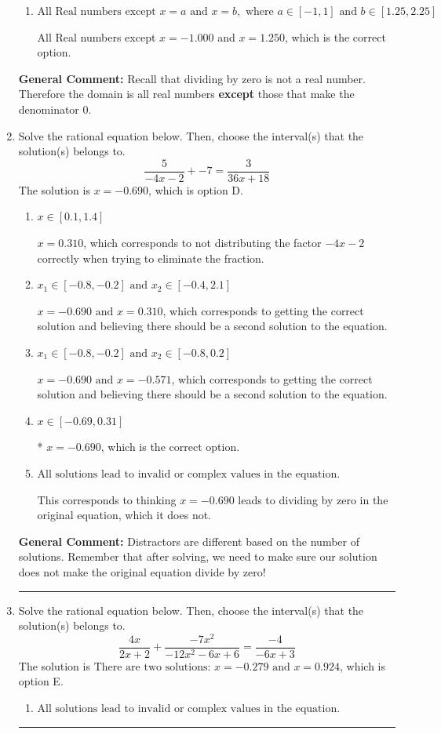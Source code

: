 \documentclass{extbook}[14pt]
\newcommand{\litem}[1]{\item #1

\rule{\textwidth}{0.4pt}}
\begin{document}
\begin{enumerate}
{\begin{enumerate}[label=\Alph*.]
All Real numbers except $x = -25.000$ and $x = 20.000$, which corresponds to not factoring the denominator correctly.
\item \( \text{All Real numbers except } x = a \text{ and } x = b, \text{ where } a \in [-1, 1] \text{ and } b \in [1.25, 2.25] \)

All Real numbers except $x = -1.000$ and $x = 1.250$, which is the correct option.
\end{enumerate}

\textbf{General Comment:} Recall that dividing by zero is not a real number. Therefore the domain is all real numbers \textbf{except} those that make the denominator 0.
}
\litem{
Solve the rational equation below. Then, choose the interval(s) that the solution(s) belongs to.
\[ \frac{5}{-4x -2} + -7 = \frac{3}{36x + 18} \]The solution is \( x = -0.690 \), which is option D.\begin{enumerate}[label=\Alph*.]
\item \( x \in [0.1,1.4] \)

$x = 0.310$, which corresponds to not distributing the factor $-4x -2$ correctly when trying to eliminate the fraction.
\item \( x_1 \in [-0.8, -0.2] \text{ and } x_2 \in [-0.4,2.1] \)

$x = -0.690 \text{ and } x = 0.310$, which corresponds to getting the correct solution and believing there should be a second solution to the equation.
\item \( x_1 \in [-0.8, -0.2] \text{ and } x_2 \in [-0.8,0.2] \)

$x = -0.690 \text{ and } x = -0.571$, which corresponds to getting the correct solution and believing there should be a second solution to the equation.
\item \( x \in [-0.69,0.31] \)

* $x = -0.690$, which is the correct option.
\item \( \text{All solutions lead to invalid or complex values in the equation.} \)

This corresponds to thinking $x = -0.690$ leads to dividing by zero in the original equation, which it does not.
\end{enumerate}

\textbf{General Comment:} Distractors are different based on the number of solutions. Remember that after solving, we need to make sure our solution does not make the original equation divide by zero!
}
\litem{
Solve the rational equation below. Then, choose the interval(s) that the solution(s) belongs to.
\[ \frac{4x}{2x + 2} + \frac{-7x^{2}}{-12x^{2} -6 x + 6} = \frac{-4}{-6x + 3} \]The solution is \( \text{There are two solutions: } x = -0.279 \text{ and } x = 0.924 \), which is option E.\begin{enumerate}[label=\Alph*.]
\item \( \text{All solutions lead to invalid or complex values in the equation.} \)



\end{enumerate}}
\end{enumerate}
\end{document}
